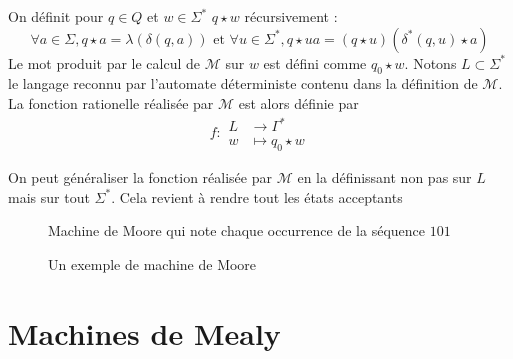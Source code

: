 \documentclass{scrartcl}
\begin{document}
\begin{flushleft}
\begin{define}
    On définit pour $q \in Q$ et $w \in \Sigma^*$ $q \star w$ récursivement :
    \[ \forall a \in \Sigma, q \star a = \lambda(\delta(q, a)) \text{ et } \forall u \in \Sigma^*,
    q \star ua = (q \star u)(\delta^*(q, u) \star a) \]
    Le mot produit par le calcul de $\mathcal{M}$ sur $w$ est défini comme $q_0 \star w$. Notons $L \subset \Sigma^*$
    le langage reconnu par l'automate déterministe contenu dans la définition de $\mathcal{M}$. La fonction rationelle
    réalisée par $\mathcal{M}$ est alors définie par
    \[ f : \begin{array}{cl}
        L &\longrightarrow \Gamma^*\\
        w &\longmapsto q_0 \star w
    \end{array} \]
\end{define}

On peut généraliser la fonction réalisée par $\mathcal{M}$ en la définissant non pas sur $L$ mais sur tout
$\Sigma^*$. Cela revient à rendre tout les états acceptants

\begin{figure}[h]
    \caption{Un exemple de machine de Moore}
        \begin{center}
        Machine de Moore qui note chaque occurrence de la séquence $101$
    \end{center}
\end{figure}

\vspace*{2cm}

\section{Machines de Mealy}


\end{flushleft}
\end{document}
